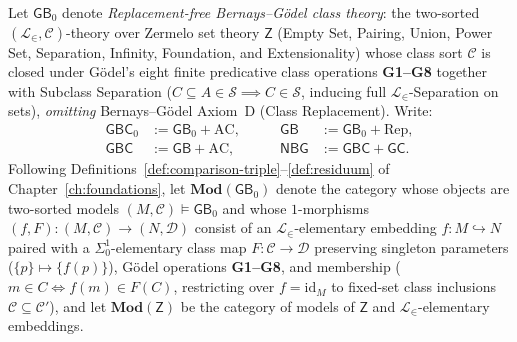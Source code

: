 \begin{definition}\label{def:set-projection-fibration}%
%
%
Let $\mathsf{GB}_0$ denote \emph{Replacement-free Bernays--G\"odel class theory}: the two-sorted $(\mathcal{L}_\in, \mathcal{C})$-theory over Zermelo set theory $\mathsf{Z}$ (Empty Set, Pairing, Union, Power Set, Separation, Infinity, Foundation, and Extensionality) whose class sort $\mathcal{C}$ is closed under G\"odel's eight finite predicative class operations \textbf{G1--G8} together with Subclass Separation ($C \subseteq A \in \mathcal{S} \implies C \in \mathcal{S}$, inducing full $\mathcal{L}_\in$-Separation on sets), \emph{omitting} Bernays--G\"odel Axiom~D (Class Replacement). Write:
\[
  \begin{aligned}
    \mathsf{GBC}_0 &:= \mathsf{GB}_0 + \mathrm{AC}, &\qquad
    \mathsf{GB} &:= \mathsf{GB}_0 + \mathrm{Rep}, \\
    \mathsf{GBC} &:= \mathsf{GB} + \mathrm{AC}, &\qquad
    \mathsf{NBG} &:= \mathsf{GBC} + \mathsf{GC}.
  \end{aligned}
\]
Following Definitions~\ref{def:comparison-triple}--\ref{def:residuum} of Chapter~\ref{ch:foundations}, let $\mathbf{Mod}(\mathsf{GB}_0)$ denote the category whose objects are two-sorted models $(M, \mathcal{C}) \models \mathsf{GB}_0$ and whose $1$-morphisms $(f, F) : (M, \mathcal{C}) \to (N, \mathcal{D})$ consist of an $\mathcal{L}_\in$-elementary embedding $f : M \hookrightarrow N$ paired with a $\Sigma^1_0$-elementary class map $F : \mathcal{C} \to \mathcal{D}$ preserving singleton parameters ($\{p\} \mapsto \{f(p)\}$), G\"odel operations \textbf{G1--G8}, and membership ($m \in C \iff f(m) \in F(C)$, restricting over $f = \mathrm{id}_M$ to fixed-set class inclusions $\mathcal{C} \subseteq \mathcal{C}'$), and let $\mathbf{Mod}(\mathsf{Z})$ be the category of models of $\mathsf{Z}$ and $\mathcal{L}_\in$-elementary embeddings.
\begin{enumerate}

\end{enumerate}
\end{definition}

